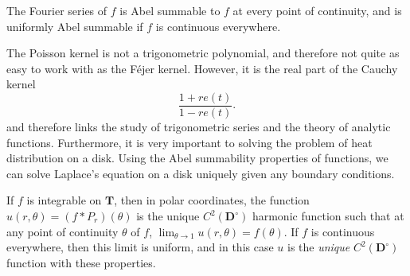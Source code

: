 \begin{theorem}
	The Fourier series of $f$ is Abel summable to $f$ at every point of continuity, and is uniformly Abel summable if $f$ is continuous everywhere.
\end{theorem}

The Poisson kernel is not a trigonometric polynomial, and therefore not quite as easy to work with as the F\'{e}jer kernel. However, it is the real part of the Cauchy kernel
%
\[ \frac{1 + re(t)}{1 - re(t)}. \]
%
and therefore links the study of trigonometric series and the theory of analytic functions. Furthermore, it is very important to solving the problem of heat distribution on a disk. Using the Abel summability properties of functions, we can solve Laplace's equation on a disk uniquely given any boundary conditions.

\begin{theorem}
    If $f$ is integrable on $\mathbf{T}$, then in polar coordinates, the function $u(r,\theta) = (f * P_r)(\theta)$ is the unique $C^2(\mathbf{D}^\circ)$ harmonic function such that at any point of continuity $\theta$ of $f$, $\lim_{\theta \to 1} u(r,\theta) = f(\theta)$. If $f$ is continuous everywhere, then this limit is uniform, and in this case $u$ is the {\it unique} $C^2(\mathbf{D}^\circ)$ function with these properties.
\end{theorem}
